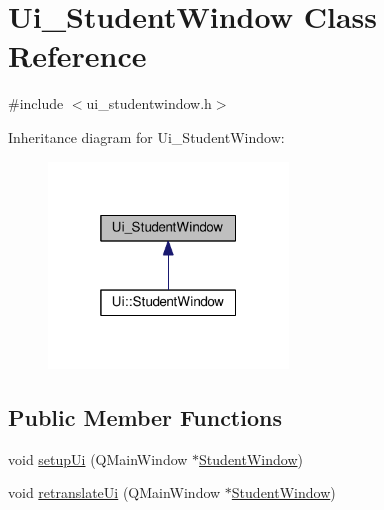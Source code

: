 \hypertarget{class_ui___student_window}{}\section{Ui\+\_\+\+Student\+Window Class Reference}
\label{class_ui___student_window}


{\ttfamily \#include $<$ui\+\_\+studentwindow.\+h$>$}



Inheritance diagram for Ui\+\_\+\+Student\+Window\+:
\nopagebreak
\begin{figure}[H]
\begin{center}
\leavevmode
\includegraphics[width=181pt]{class_ui___student_window__inherit__graph}
\end{center}
\end{figure}
\subsection*{Public Member Functions}
\begin{DoxyCompactItemize}
\item 
void \hyperlink{class_ui___student_window_a6ce5b9fe4f5173fbc3d56bcaea852f9e}{setup\+Ui} (Q\+Main\+Window $\ast$\hyperlink{class_student_window}{Student\+Window})
\item 
void \hyperlink{class_ui___student_window_a1fc2da528074f28be5f44ef85b95085f}{retranslate\+Ui} (Q\+Main\+Window $\ast$\hyperlink{class_student_window}{Student\+Window})
\end{DoxyCompactItemize}
